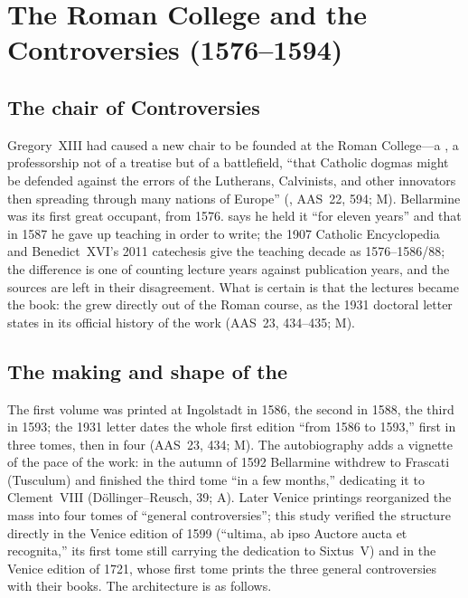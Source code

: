 \section{The Roman College and the Controversies (1576--1594)}

\subsection{The chair of Controversies}

Gregory~XIII had caused a new chair to be founded at the Roman
College---a , a professorship not of
a treatise but of a battlefield, ``that Catholic dogmas might be
defended against the errors of the Lutherans, Calvinists, and other
innovators then spreading through many nations of Europe''
(, AAS~22, 594; M). Bellarmine was its first great
occupant, from 1576.  says he held it ``for eleven
years'' and that in 1587 he gave up teaching in order to write; the
1907 Catholic Encyclopedia and Benedict~XVI's 2011 catechesis give
the teaching decade as 1576--1586/88; the difference is one of
counting lecture years against publication years, and the sources
are left in their disagreement. What is certain is that the lectures
became the book: the  grew directly
out of the Roman course, as the 1931 doctoral letter states in its
official history of the work (AAS~23, 434--435; M).

\subsection{The making and shape of the }

The first volume was printed at Ingolstadt in 1586, the second in
1588, the third in 1593; the 1931 letter dates the whole first
edition ``from 1586 to 1593,'' first in three tomes, then in four
(AAS~23, 434; M). The autobiography adds a vignette of the pace of
the work: in the autumn of 1592 Bellarmine withdrew to Frascati
(Tusculum) and finished the third tome ``in a few months,''
dedicating it to Clement~VIII (D\"ollinger--Reusch, 39; A). Later
Venice printings reorganized the mass into four tomes of ``general
controversies''; this study verified the structure directly in the
Venice edition of 1599 (``ultima, ab ipso Auctore aucta et
recognita,'' its first tome still carrying the dedication to
Sixtus~V) and in the Venice edition of 1721, whose first tome
prints the three general controversies with their books. The
architecture is as follows.

